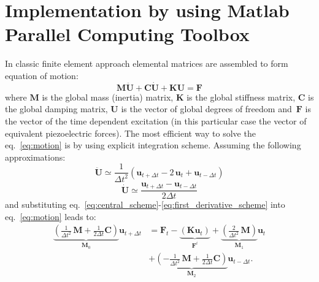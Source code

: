\documentclass[preprint,12pt]{elsarticle}
\renewcommand{\vec}[1]{\mathbf{#1}}
\renewcommand{\bm}[1]{\mathbf{#1}}
\begin{document}
	\section{Implementation by using Matlab Parallel Computing Toolbox}
	In classic finite element approach elemental matrices are assembled to form equation of motion:
	\begin{equation}
	\bm{M} \vec{\ddot{U}} + \bm{C} \vec{\dot{U}} + \bm{K} \vec{U} = \vec{F} \label{eq:motion}
	\end{equation}  
	where $ \bm{M} $ is the global mass (inertia) matrix, $ \bm{K} $ is the global stiffness matrix,  $\bm{C} $ is the global damping matrix, $\vec{U}$ is the vector of global degrees of freedom and~$\vec{F}$ is the vector of the time dependent excitation (in this particular case the vector of equivalent piezoelectric forces). The most efficient way to solve the eq.~\ref{eq:motion} is by using explicit integration scheme. Assuming the following approximations:
	\begin{equation}
	\ddot{\vec{U}}\simeq \frac{1}{\Delta t^2} \left(\vec{u}_{t+\Delta t} - 2\,\vec{u}_t + \vec{u}_{t-\Delta t}\right) \label{eq:central_scheme}
	\end{equation}
	\begin{equation}
	\dot{\vec{U}}\simeq \frac{\vec{u}_{t+\Delta t} -\vec{u}_{t-\Delta t}}{2 \Delta t}
	\label{eq:first_derivative_scheme}
	\end{equation}
	and substituting eq.~\ref{eq:central_scheme}-\ref{eq:first_derivative_scheme} into eq.~\ref{eq:motion} leads to:
	\begin{equation}
	\begin{split}
	\underbrace{\left(\frac{1}{\Delta t^2} \,\bm{M} + \frac{1}{2 \Delta t} \bm{C}\right)}_{\vec{M}_0} \vec{u}_{t+\Delta t} &= \vec{F}_t - \underbrace{\left(\bm{K} \vec{u}_t\right)}_{\vec{F}^i} + \underbrace{\left(\frac{2}{\Delta t^2} \,\bm{M} \right)}_{\vec{M}_1}\vec{u}_t \\
	&+ \underbrace{\left(- \frac{1}{\Delta t^2} \,\bm{M} + \frac{1}{2 \Delta t} \bm{C}\right)}_{\vec{M}_2} \vec{u}_{t-\Delta t}.
	\label{eq:explicit_integration}
	\end{split}
	\end{equation}
\end{document}
